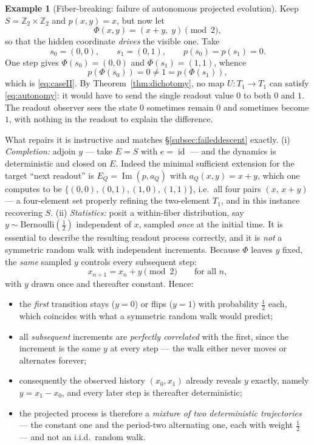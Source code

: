 \documentclass[11pt,reqno]{amsart}
\theoremstyle{plain}
\theoremstyle{definition}
\newtheorem{example}[theorem]{Example}
\theoremstyle{remark}
\DeclareMathOperator{\Ima}{Im}
\DeclareMathOperator{\id}{id}
\begin{document}
\begin{example}[Fiber-breaking: failure of autonomous projected evolution]\label{ex:fiberbreaking}
Keep $S=\mathbb Z_2\times\mathbb Z_2$ and $p(x,y)=x$, but now let
\[
\Phi(x,y)=(x+y,\;y)\pmod 2 ,
\]
so that the hidden coordinate \emph{drives} the visible one. Take
\[
s_0=(0,0),\qquad s_1=(0,1),\qquad p(s_0)=p(s_1)=0 .
\]
One step gives $\Phi(s_0)=(0,0)$ and $\Phi(s_1)=(1,1)$, whence
\[
p(\Phi(s_0))=0\neq 1=p(\Phi(s_1)),
\]
which is \eqref{eq:caseII}. By Theorem~\ref{thm:dichotomy}, no map $U\colon T_1\to T_1$ can satisfy \eqref{eq:autonomy}: it would have to send the single readout value $0$ to both $0$ and $1$. The readout observer sees the state $0$ sometimes remain $0$ and sometimes become $1$, with nothing in the readout to explain the difference.

What repairs it is instructive and matches \S\ref{subsec:faileddescent} exactly. (i) \emph{Completion:} adjoin $y$ --- take $E=S$ with $e=\id$ --- and the dynamics is deterministic and closed on $E$. Indeed the minimal sufficient extension for the target ``next readout'' is $E_Q=\Ima(p,a_Q)$ with $a_Q(x,y)=x+y$, which one computes to be $\{(0,0),(0,1),(1,0),(1,1)\}$, i.e.\ all four pairs $(x,\,x+y)$ --- a four-element set properly refining the two-element $T_1$, and in this instance recovering $S$. (ii) \emph{Statistics:} posit a within-fiber distribution, say $y\sim\mathrm{Bernoulli}(\tfrac12)$ independent of $x$, sampled \emph{once} at the initial time. It is essential to describe the resulting readout process correctly, and it is \emph{not} a symmetric random walk with independent increments. Because $\Phi$ leaves $y$ fixed, the \emph{same} sampled $y$ controls every subsequent step:
\[
x_{n+1}=x_n+y \pmod 2\qquad\text{for all }n,
\]
with $y$ drawn once and thereafter constant. Hence:
\begin{itemize}
\item the \emph{first} transition stays ($y=0$) or flips ($y=1$) with probability $\tfrac12$ each, which coincides with what a symmetric random walk would predict;
\item all \emph{subsequent} increments are \emph{perfectly correlated} with the first, since the increment is the same $y$ at every step --- the walk either never moves or alternates forever;
\item consequently the observed history $(x_0,x_1)$ already reveals $y$ exactly, namely $y=x_1-x_0$, and every later step is thereafter deterministic;
\item the projected process is therefore a \emph{mixture of two deterministic trajectories} --- the constant one and the period-two alternating one, each with weight $\tfrac12$ --- and not an i.i.d.\ random walk.

\end{itemize}
\end{example}
\end{document}
